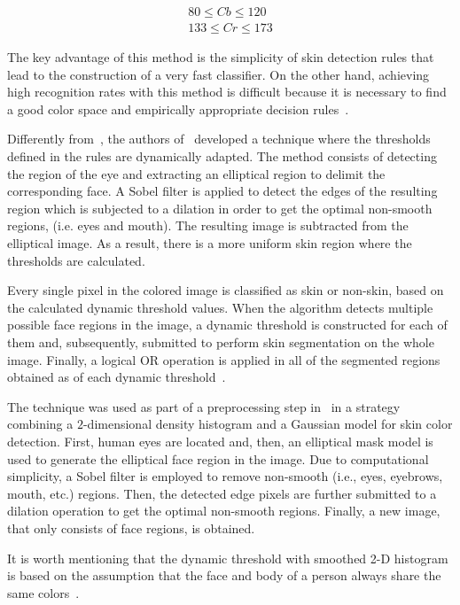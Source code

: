 \begin{align*}
80  \leq Cb \leq 120 \\
133 \leq Cr \leq 173
\end{align*}

The key advantage of this method is the simplicity of skin detection rules that lead to the construction of a very fast classifier. On the other hand, achieving high recognition rates with this method is difficult because it is necessary to find a good color space and empirically appropriate decision rules~\citep{vezhnevets:03}.

Differently from~\citet{kovac:03}, the authors of~\citet{yogarajah:11} developed a technique where the thresholds defined in the rules are dynamically adapted. The method consists of detecting the region of the eye and extracting an elliptical region to delimit the corresponding face. A Sobel filter is applied to detect the edges of the resulting region which is subjected to a dilation in order to get the optimal non-smooth regions, (i.e. eyes and mouth). The resulting image is subtracted from the elliptical image. As a result, there is a more uniform skin region where the thresholds are calculated.

Every single pixel in the colored image is classified as skin or non-skin, based on the calculated dynamic threshold values. When the algorithm detects multiple possible face regions in the image, a dynamic threshold is constructed for each of them and, subsequently, submitted to perform skin segmentation on the whole image. Finally, a logical OR operation is applied in all of the segmented regions obtained as of each dynamic threshold~\citep{yogarajah:11}.

The technique was used as part of a preprocessing step in~\citet{tan:12} in a strategy combining a $2$-dimensional density histogram and a Gaussian model for skin color detection. First, human eyes are located and, then, an elliptical mask model is used to generate the elliptical face region in the image. Due to computational simplicity, a Sobel filter is employed to remove non-smooth (i.e., eyes, eyebrows, mouth, etc.) regions. Then, the detected edge pixels are further submitted to a dilation operation to get the optimal non-smooth regions. Finally, a new image, that only consists of face regions, is obtained.

It is worth mentioning that the dynamic threshold with smoothed 2-D histogram is based on the assumption that the face and body of a person always share the same colors~\citep{tan:12}.

